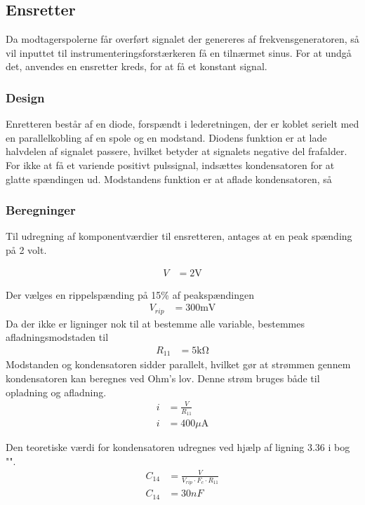 \subsection{Ensretter}
Da modtagerspolerne får overført signalet der genereres af frekvensgeneratoren, så vil inputtet til instrumenteringsforstærkeren få en tilnærmet sinus. 
For at undgå det, anvendes en ensretter kreds, for at få et konstant signal.

\subsubsection{Design}
Enretteren består af en diode, forspændt i lederetningen, der er koblet serielt med en parallelkobling af en spole og en modstand. 
Diodens funktion er at lade halvdelen af signalet passere, hvilket betyder at signalets negative del frafalder. 
For ikke at få et variende positivt pulssignal, indsættes kondensatoren for at glatte spændingen ud. Modstandens funktion er at aflade kondensatoren, så



\subsubsection{Beregninger}
Til udregning af komponentværdier til ensretteren, antages at en peak spænding på 2 volt.

\begin{align}
	V & = 2 \si{\volt} \nonumber
\end{align}

Der vælges en rippelspænding på 15\% af peakspændingen
\begin{align}
	V_{rip} & = 300 \si{\milli\volt} \nonumber
\end{align}
Da der ikke er ligninger nok til at bestemme alle variable, bestemmes afladningsmodstaden til
\begin{align}
	R_{11} & = 5 \si{\kilo\ohm} \nonumber
\end{align}
Modstanden og kondensatoren sidder parallelt, hvilket gør at strømmen gennem kondensatoren kan beregnes ved Ohm's lov. Denne strøm bruges både til opladning og afladning.
\begin{align}
	i & = \frac{V}{R_{11}} \\
	i & = 400 \si{\mu\ampere}\nonumber
\end{align}

Den teoretiske værdi for kondensatoren udregnes ved hjælp af ligning 3.36 i bog "\cite[side. 160]{Sedra19uu}".
\begin{align}
	C_{14} & = \frac{V}{V_{rip} \cdot F_c \cdot R_{11}}\\
		C_{14} & = 30nF \nonumber
\end{align}

